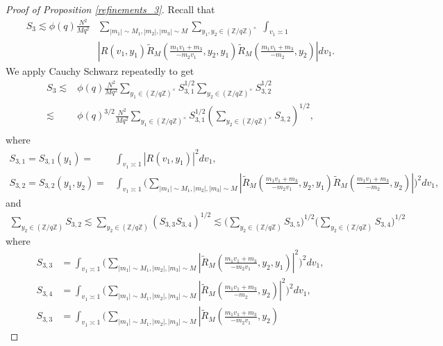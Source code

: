 \begin{proof}[Proof of Proposition \ref{refinements_3}]
    Recall that \begin{align*}
        S_3\lesssim \phi(q)\frac{N^2}{Mq^2}&\sum_{|m_1|\sim M_1,|m_2|,|m_3|\sim M}  \sum_{y_1,y_2\in (\mathbb{Z}/q\mathbb{Z})^\times}\ \int_{v_1\asymp 1}\\& \left|R\left(v_1,y_1\right) \tilde{R}_M\left(\frac{m_1v_1+m_3}{-m_2v_1},y_2,y_1\right)
        \tilde{R}_M\left(\frac{m_1v_1+m_3}{-m_2},y_2\right)\right| dv_1.
    \end{align*}
    We apply Cauchy Schwarz repeatedly to get \begin{align*}
    S_3 \lesssim& \phi(q)\frac{N^2}{Mq^2}\sum_{y_1\in (\mathbb{Z}/q\mathbb{Z})^\times} S_{3,1}^{1/2}\sum_{y_2\in (\mathbb{Z}/q\mathbb{Z})^\times}S_{3,2}^{1/2}\\
        \lesssim & \phi(q)^{3/2}\frac{N^2}{Mq^2}\sum_{y_1\in (\mathbb{Z}/q\mathbb{Z})^\times} S_{3,1}^{1/2}\left(\sum_{y_2\in (\mathbb{Z}/q\mathbb{Z})^\times}S_{3,2}\right)^{1/2},\\
    \end{align*}
    where \begin{align*}
        S_{3,1}= S_{3,1}(y_1) =& \int_{v_1\asymp 1} |R\left(v_1,y_1\right)|^2 dv_1,\\
        S_{3,2}=S_{3,2}(y_1,y_2) =& \int_{v_1\asymp 1}\Bigg(\sum_{|m_1|\sim M_1,|m_2|,|m_3|\sim M} \left|\tilde{R}_M\left(\frac{m_1v_1+m_3}{-m_2v_1},y_2,y_1\right)
        \tilde{R}_M\left(\frac{m_1v_1+m_3}{-m_2},y_2\right)\right|\Bigg)^2 dv_1,
    \end{align*}
    and \begin{align*}
        \sum_{y_2\in (\mathbb{Z}/q\mathbb{Z})} S_{3,2}\lesssim \sum_{y_2\in (\mathbb{Z}/q\mathbb{Z})} (S_{3,3}S_{3,4})^{1/2}\lesssim \bigg(\sum_{y_2\in (\mathbb{Z}/q\mathbb{Z})}S_{3,5} \bigg)^{1/2} \bigg(\sum_{y_2\in (\mathbb{Z}/q\mathbb{Z})}S_{3,4} \bigg)^{1/2}
    \end{align*}
    where \begin{align*}
        S_{3,3}& = \int_{v_1\asymp 1}\Bigg(\sum_{|m_1|\sim M_1,|m_2|,|m_3|\sim M} \left|\tilde{R}_M\left(\frac{m_1v_1+m_3}{-m_2v_1},y_2,y_1\right)
        \right|^2\Bigg)^2 dv_1,\\
        S_{3,4}& = \int_{v_1\asymp 1}\Bigg(\sum_{|m_1|\sim M_1,|m_2|,|m_3|\sim M} \left|
        \tilde{R}_M\left(\frac{m_1v_1+m_3}{-m_2},y_2\right)\right|^2\Bigg)^2 dv_1,\\
        S_{3,3}& = \int_{v_1\asymp 1}\Bigg(\sum_{|m_1|\sim M_1,|m_2|,|m_3|\sim M} \left|\tilde{R}_M\left(\frac{m_1v_1+m_3}{-m_2v_1},y_2\right)

\end{align*}
\end{proof}
